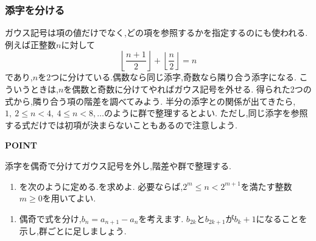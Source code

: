 \subsubsection{添字を分ける}\label{節：添字を分ける}
ガウス記号は項の値だけでなく,どの項を参照するかを指定するのにも使われる.
例えば正整数$n$に対して
\[
  \left\lfloor\frac{n+1}{2}\right\rfloor
  +\left\lfloor\frac n2\right\rfloor=n
\]
であり,$n$を2つに分けている.偶数なら同じ添字,奇数なら隣り合う添字になる.
こういうときは,$n$を偶数と奇数に分けてやればガウス記号を外せる.
得られた2つの式から,隣り合う項の階差を調べてみよう.
半分の添字との関係が出てきたら,$1,\ 2\le n<4,\ 4\le n<8,\ldots$のように群で整理するとよい.
ただし,同じ添字を参照する式だけでは初項が決まらないこともあるので注意しよう.

\begin{bookpoint}
  \textbf{POINT}\par
  添字を偶奇で分けてガウス記号を外し,階差や群で整理する.
\end{bookpoint}

\noindent {}\par\nobreak
\begin{enumerate}[label=(\arabic*),parsep=3pt,beginpenalty=10000,format=\bookitemlink{example-gauss-role-7}{problem}{answer}]
  \item {}を次のように定める.を求めよ.
    \BookMathLayout{            \[
        a_1=2,\qquad
        a_n=a_{\left\lfloor\frac{n+1}{2}\right\rfloor}
        +a_{\left\lfloor\frac n2\right\rfloor}+n-1
        \quad(n\ge2).
      \]}{            \[
        \begin{aligned}
          a_1&=2,\\
          a_n&=a_{\left\lfloor\frac{n+1}{2}\right\rfloor}
          +a_{\left\lfloor\frac n2\right\rfloor}+n-1
          \\              &\quad(n\ge2).
        \end{aligned}
      \]}
    必要ならば,$2^m\le n<2^{m+1}$を満たす整数$m\ge0$を用いてよい.
\end{enumerate}

\noindent {}\par\nobreak
\begin{enumerate}[label=(\arabic*),parsep=3pt,beginpenalty=10000,format=\bookitemlink{example-gauss-role-7}{hint}{problem}]
  \item 偶奇で式を分け,$b_n=a_{n+1}-a_n$を考えます.
    $b_{2k}$と$b_{2k+1}$が$b_k+1$になることを示し,群ごとに足しましょう.
\end{enumerate}


